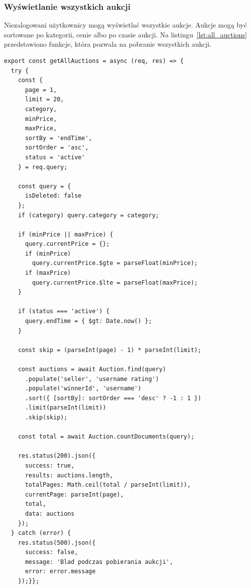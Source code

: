\subsubsection{Wyświetlanie wszystkich aukcji}

Niezalogowani użytkownicy mogą wyświetlać wszystkie aukcje. Aukcje mogą być sortowane po kategorii, cenie albo po czasie aukcji. Na listingu~\ref{lst:all_auctions} przedstawiono funkcje, która pozwala na pobranie wszystkich aukcji.

\begin{lstlisting}[style=javascript, caption = {Obsługa mechanizmu wyświetlania wszystkich aukcji}, label = {lst:all_auctions}]
export const getAllAuctions = async (req, res) => {
  try {
    const {
      page = 1,
      limit = 20,
      category,
      minPrice,
      maxPrice,
      sortBy = 'endTime',
      sortOrder = 'asc',
      status = 'active'
    } = req.query;

    const query = {
      isDeleted: false
    };
    if (category) query.category = category;

    if (minPrice || maxPrice) {
      query.currentPrice = {};
      if (minPrice) 
        query.currentPrice.$gte = parseFloat(minPrice);
      if (maxPrice) 
        query.currentPrice.$lte = parseFloat(maxPrice);
    }

    if (status === 'active') {
      query.endTime = { $gt: Date.now() };
    }

    const skip = (parseInt(page) - 1) * parseInt(limit);

    const auctions = await Auction.find(query)
      .populate('seller', 'username rating')
      .populate('winnerId', 'username')
      .sort({ [sortBy]: sortOrder === 'desc' ? -1 : 1 })
      .limit(parseInt(limit))
      .skip(skip);

    const total = await Auction.countDocuments(query);

    res.status(200).json({
      success: true,
      results: auctions.length,
      totalPages: Math.ceil(total / parseInt(limit)),
      currentPage: parseInt(page),
      total,
      data: auctions
    });
  } catch (error) {
    res.status(500).json({
      success: false,
      message: 'Blad podczas pobierania aukcji',
      error: error.message
    });}};
\end{lstlisting}

